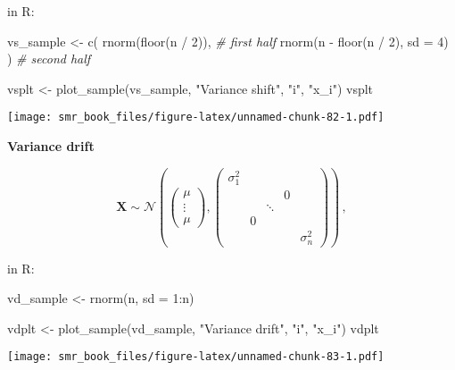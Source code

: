 \documentclass[
  oneside]{book}
\newenvironment{Shaded}{\begin{snugshade}}{\end{snugshade}}
\newcommand{\AttributeTok}[1]{\textcolor[rgb]{0.77,0.63,0.00}{#1}}
\newcommand{\CommentTok}[1]{\textcolor[rgb]{0.56,0.35,0.01}{\textit{#1}}}
\newcommand{\DecValTok}[1]{\textcolor[rgb]{0.00,0.00,0.81}{#1}}
\newcommand{\FunctionTok}[1]{\textcolor[rgb]{0.00,0.00,0.00}{#1}}
\newcommand{\NormalTok}[1]{#1}
\newcommand{\OtherTok}[1]{\textcolor[rgb]{0.56,0.35,0.01}{#1}}
\newcommand{\SpecialCharTok}[1]{\textcolor[rgb]{0.00,0.00,0.00}{#1}}
\newcommand{\StringTok}[1]{\textcolor[rgb]{0.31,0.60,0.02}{#1}}
\begin{document}
in R:

\begin{Shaded}
\begin{Highlighting}[]
\NormalTok{vs\_sample }\OtherTok{\textless{}{-}} \FunctionTok{c}\NormalTok{(}
  \FunctionTok{rnorm}\NormalTok{(}\FunctionTok{floor}\NormalTok{(n }\SpecialCharTok{/} \DecValTok{2}\NormalTok{)), }\CommentTok{\# first half}
  \FunctionTok{rnorm}\NormalTok{(n }\SpecialCharTok{{-}} \FunctionTok{floor}\NormalTok{(n }\SpecialCharTok{/} \DecValTok{2}\NormalTok{), }\AttributeTok{sd =} \DecValTok{4}\NormalTok{)}
\NormalTok{) }\CommentTok{\# second half}

\NormalTok{vsplt }\OtherTok{\textless{}{-}} \FunctionTok{plot\_sample}\NormalTok{(vs\_sample, }\StringTok{"Variance shift"}\NormalTok{, }\StringTok{"i"}\NormalTok{, }\StringTok{"x\_i"}\NormalTok{)}
\NormalTok{vsplt}
\end{Highlighting}
\end{Shaded}

\texttt{[image: smr\_book\_files/figure-latex/unnamed-chunk-82-1.pdf]}

\textbf{Variance drift}

\[
\mathbf{X} \sim \mathcal{N}\left(
\begin{pmatrix}
\mu \\ \vdots \\ \mu
\end{pmatrix}, 
\begin{pmatrix}
\sigma_1^2 & & & & \\
 & & & 0 & \\
 & & \ddots & &  \\
 & 0 & & & \\
 & & & & \sigma_n^2
\end{pmatrix}
\right)\,,
\]

in R:

\begin{Shaded}
\begin{Highlighting}[]
\NormalTok{vd\_sample }\OtherTok{\textless{}{-}} \FunctionTok{rnorm}\NormalTok{(n, }\AttributeTok{sd =} \DecValTok{1}\SpecialCharTok{:}\NormalTok{n)}

\NormalTok{vdplt }\OtherTok{\textless{}{-}} \FunctionTok{plot\_sample}\NormalTok{(vd\_sample, }\StringTok{"Variance drift"}\NormalTok{, }\StringTok{"i"}\NormalTok{, }\StringTok{"x\_i"}\NormalTok{)}
\NormalTok{vdplt}
\end{Highlighting}
\end{Shaded}

\texttt{[image: smr\_book\_files/figure-latex/unnamed-chunk-83-1.pdf]}
\end{document}

